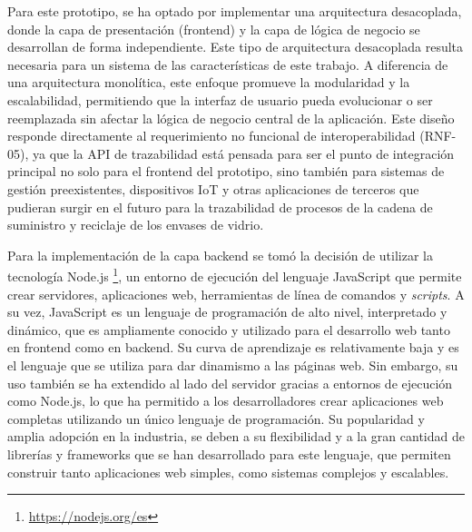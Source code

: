 Para este prototipo, se ha optado por implementar una arquitectura desacoplada, donde la capa de presentación (frontend) y la capa de lógica de negocio se desarrollan de forma independiente. Este tipo de arquitectura desacoplada resulta necesaria para un sistema de las características de este trabajo. A diferencia de una arquitectura monolítica, este enfoque promueve la modularidad y la escalabilidad, permitiendo que la interfaz de usuario pueda evolucionar o ser reemplazada sin afectar la lógica de negocio central de la aplicación. Este diseño responde directamente al requerimiento no funcional de interoperabilidad (RNF-05), ya que la API de trazabilidad está pensada para ser el punto de integración principal no solo para el frontend del prototipo, sino también para sistemas de gestión preexistentes, dispositivos IoT y otras aplicaciones de terceros que pudieran surgir en el futuro para la trazabilidad de procesos de la cadena de suministro y reciclaje de los envases de vidrio.

Para la implementación de la capa backend se tomó la decisión de utilizar la tecnología Node.js \footnote{\url{https://nodejs.org/es}}, un entorno de ejecución del lenguaje JavaScript que permite crear servidores, aplicaciones web, herramientas de línea de comandos y \textit{scripts}. A su vez, JavaScript es un lenguaje de programación de alto nivel, interpretado y dinámico, que es ampliamente conocido y utilizado para el desarrollo web tanto en frontend como en backend. Su curva de aprendizaje es relativamente baja y es el lenguaje que se utiliza para dar dinamismo a las páginas web. Sin embargo, su uso también se ha extendido al lado del servidor gracias a entornos de ejecución como Node.js, lo que ha permitido a los desarrolladores crear aplicaciones web completas utilizando un único lenguaje de programación. Su popularidad y amplia adopción en la industria, se deben a su flexibilidad y a la gran cantidad de librerías y frameworks que se han desarrollado para este lenguaje, que permiten construir tanto aplicaciones web simples, como sistemas complejos y escalables.

